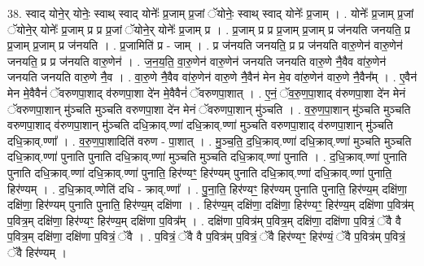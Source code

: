 \documentclass[17pt]{extarticle}
\begin{document}
38. स्वाद् योने॒र् योनेः॒ स्वाथ् स्वाद् योनेः᳚ प्र॒जाम् प्र॒जां ॅयोनेः॒ स्वाथ् स्वाद् योनेः᳚ प्र॒जाम् । . योनेः᳚ प्र॒जाम् प्र॒जां ॅयोने॒र् योनेः᳚ प्र॒जाम् प्र प्र प्र॒जां ॅयोने॒र् योनेः᳚ प्र॒जाम् प्र । . प्र॒जाम् प्र प्र प्र॒जाम् प्र॒जाम् प्र ज॑नयति जनयति॒ प्र प्र॒जाम् प्र॒जाम् प्र ज॑नयति । . प्र॒जामिति॑ प्र - जाम् । . प्र ज॑नयति जनयति॒ प्र प्र ज॑नयति वारु॒णेन॑ वारु॒णेन॑ जनयति॒ प्र प्र ज॑नयति वारु॒णेन॑ । . ज॒न॒य॒ति॒ वा॒रु॒णेन॑ वारु॒णेन॑ जनयति जनयति वारु॒णे नै॒वैव वा॑रु॒णेन॑ जनयति जनयति वारु॒णे नै॒व । . वा॒रु॒णे नै॒वैव वा॑रु॒णेन॑ वारु॒णे नै॒वैन॑ मेन मे॒व वा॑रु॒णेन॑ वारु॒णे नै॒वैन᳚म् । . ए॒वैन॑ मेन मे॒वैवैनं॑ ॅवरुणपा॒शाद् व॑रुणपा॒शा दे॑न मे॒वैवैनं॑ ॅवरुणपा॒शात् । . ए॒नं॒ ॅव॒रु॒ण॒पा॒शाद् व॑रुणपा॒शा दे॑न मेनं ॅवरुणपा॒शान् मु॑ञ्चति मुञ्चति वरुणपा॒शा दे॑न मेनं ॅवरुणपा॒शान् मु॑ञ्चति । . व॒रु॒ण॒पा॒शान् मु॑ञ्चति मुञ्चति वरुणपा॒शाद् व॑रुणपा॒शान् मु॑ञ्चति दधि॒क्राव्.ण्णा॑ दधि॒क्राव्.ण्णा॑ मुञ्चति वरुणपा॒शाद् व॑रुणपा॒शान् मु॑ञ्चति दधि॒क्राव्.ण्णा᳚ । . व॒रु॒ण॒पा॒शादिति॑ वरुण - पा॒शात् । . मु॒ञ्च॒ति॒ द॒धि॒क्राव्.ण्णा॑ दधि॒क्राव्.ण्णा॑ मुञ्चति मुञ्चति दधि॒क्राव्.ण्णा॑ पुनाति पुनाति दधि॒क्राव्.ण्णा॑ मुञ्चति मुञ्चति दधि॒क्राव्.ण्णा॑ पुनाति । . द॒धि॒क्राव्.ण्णा॑ पुनाति पुनाति दधि॒क्राव्.ण्णा॑ दधि॒क्राव्.ण्णा॑ पुनाति॒ हिर॑ण्यꣳ॒॒ हिर॑ण्यम् पुनाति दधि॒क्राव्.ण्णा॑ दधि॒क्राव्.ण्णा॑ पुनाति॒ हिर॑ण्यम् । . द॒धि॒क्राव्.ण्णेति॑ दधि - क्राव्.ण्णा᳚ । . पु॒ना॒ति॒ हिर॑ण्यꣳ॒॒ हिर॑ण्यम् पुनाति पुनाति॒ हिर॑ण्य॒म् दक्षि॑णा॒ दक्षि॑णा॒ हिर॑ण्यम् पुनाति पुनाति॒ हिर॑ण्य॒म् दक्षि॑णा । . हिर॑ण्य॒म् दक्षि॑णा॒ दक्षि॑णा॒ हिर॑ण्यꣳ॒॒ हिर॑ण्य॒म् दक्षि॑णा प॒वित्र॑म् प॒वित्र॒म् दक्षि॑णा॒ हिर॑ण्यꣳ॒॒ हिर॑ण्य॒म् दक्षि॑णा प॒वित्र᳚म् । . दक्षि॑णा प॒वित्र॑म् प॒वित्र॒म् दक्षि॑णा॒ दक्षि॑णा प॒वित्रं॒ ॅवै वै प॒वित्र॒म् दक्षि॑णा॒ दक्षि॑णा प॒वित्रं॒ ॅवै । . प॒वित्रं॒ ॅवै वै प॒वित्र॑म् प॒वित्रं॒ ॅवै हिर॑ण्यꣳ॒॒ हिर॑ण्यं॒ ॅवै प॒वित्र॑म् प॒वित्रं॒ ॅवै हिर॑ण्यम् । \newline
\end{document}
